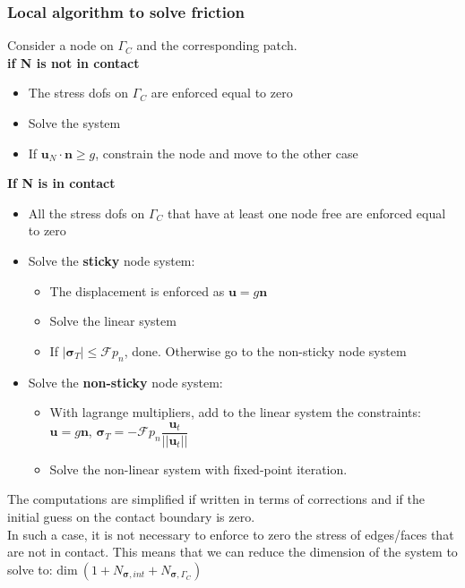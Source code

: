 \documentclass[8pt, oneside]{beamer}   	%
\newcommand{\bn}{\textbf{n}}
\newcommand{\bu}{\textbf{u}}
\newcommand{\bsigma}{\boldsymbol{\sigma}}
\begin{document}
\begin{frame}
\frametitle{\textbf{Local algorithm to solve friction}}
Consider a node on $\Gamma_C$ and the corresponding patch. \\
\textbf{if N is not in contact}

\begin{itemize}
\item The stress dofs on $\Gamma_C$ are enforced equal to zero
\item Solve the system
\item If $\bu_N \cdot \bn \geq g$, constrain the node and move to the other case
\end{itemize}

\textbf{If N is in contact}
\begin{itemize}
\item All the stress dofs on $\Gamma_C$ that have at least one node free are enforced equal to zero
\item Solve the \textbf{sticky} node system: 
\begin{itemize}
\item  The displacement is enforced as $\bu = g \bn$
\item Solve the linear system
\item  If $|\bsigma_T| \leq \mathcal{F} p_n$, done. Otherwise go to the non-sticky node system
\end{itemize}
\item Solve the \textbf{non-sticky} node system: 
\begin{itemize}
\item  With lagrange multipliers, add to the linear system the constraints:  $\bu = g \bn$, $\bsigma_T =- \mathcal{F} p_n \dfrac{\bu_t}{||\bu_t||}$
\item Solve the non-linear system with fixed-point iteration. 
\end{itemize}
\end{itemize}

The computations are simplified if written in terms of corrections and if the initial guess on the contact boundary is zero.\\
In such a case, it is not necessary to enforce to zero the stress of edges/faces that are not in contact. This means that we can reduce the dimension of the system to solve to: $\text{dim}\: (1 + N_{\bsigma,int} + N_{\bsigma,\Gamma_C})$
\end{frame}
\end{document}
